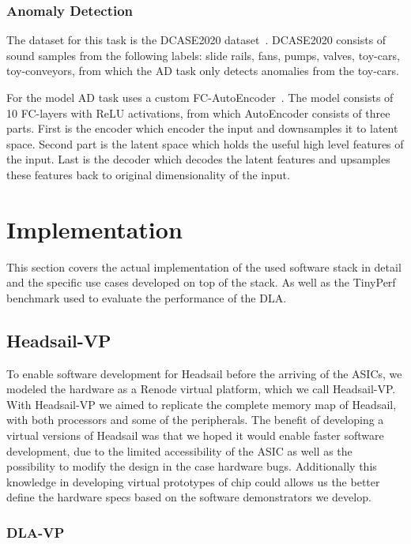 \documentclass[12pt,a4paper,english
]{tunithesis}
\begin{document}
\subsection{Anomaly Detection}
The dataset for this task is the DCASE2020 dataset~\cite{koizumi_description_2020}. DCASE2020 consists of sound samples from the following labels: slide rails, fans, pumps, valves, toy-cars, toy-conveyors, from which the AD task only detects anomalies from the toy-cars.

For the model AD task uses a custom FC-AutoEncoder~\cite{FC-Auto}. The model consists of 10 FC-layers with ReLU activations, from which
AutoEncoder consists of three parts. First is the encoder which encoder the input and downsamples it to latent space. Second part is the latent space which holds the useful high level features of the input. Last is the decoder which decodes the latent features and upsamples these features back to original dimensionality of the input.

\chapter{Implementation}
\label{ch:implementation}
This section covers the actual implementation of the used software stack in detail and the specific use cases developed on top of the stack. As well as the TinyPerf benchmark used to evaluate the performance of the DLA.

\section{Headsail-VP}
To enable software development for Headsail before the arriving of the ASICs, we modeled the hardware as a Renode virtual platform, which we call Headsail-VP. With Headsail-VP we aimed to replicate the complete memory map of Headsail, with both processors and some of the peripherals.
The benefit of developing a virtual versions of Headsail was that we hoped it would enable faster software development, due to the limited accessibility of the ASIC as well as the possibility to modify the design in the case hardware bugs.
Additionally this knowledge in developing virtual prototypes of chip could allows us the better define the hardware specs based on the software demonstrators we develop.

\subsection{DLA-VP}
\end{document}
